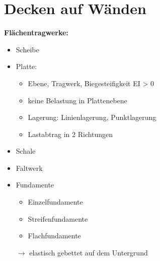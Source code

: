 

	\begin{minipage}{0.5\linewidth}
		\section{Decken auf Wänden}
		
		\textbf{Flächentragwerke:}
			
			\begin{itemize}
				
				\item Scheibe
				
				\item Platte:
					
					\begin{itemize}
						
						\item Ebene, Tragwerk, Biegesteifigkeit EI > 0
						
						\item keine Belastung in Plattenebene
						
						\item Lagerung: Linienlagerung, Punktlagerung
						
						\item Lastabtrag in 2 Richtungen
						
					\end{itemize}
										
				
			\end{itemize}
		
		
	\end{minipage}
	\begin{minipage}{0.5\linewidth}
		
		\begin{itemize}
			
			\item Schale
			
			\item Faltwerk
			
			\item Fundamente
			
			\begin{itemize}
				
				\item Einzelfundamente
				
				\item Streifenfundamente
				
				\item Flachfundamente
				
			\end{itemize}
			$ \rightarrow $ elastisch gebettet auf dem Untergrund
			
			
		\end{itemize}
		
	\end{minipage}
